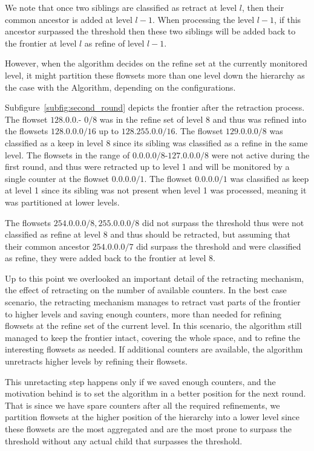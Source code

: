 We note that once two siblings are classified as retract at level $l$, then their common ancestor is added at level $l-1$. When processing the level $l-1$, if this ancestor surpassed the threshold then these two siblings will be added back to the frontier at level $l$ as refine of level $l-1$.

However, when the algorithm decides on the refine set at the currently monitored level, it might partition these flowsets more than one level down the hierarchy as the case with the \multipleAlgo Algorithm, depending on the configurations.

Subfigure~\ref{subfig:second_round} depicts the frontier after the retraction process. The flowset $128.0.0.$- $0/8$ was in the refine set of level 8 and thus was refined into the flowsets $128.0.0.0/16$ up to $128.255.0.0/16$. The flowset $129.0.0.0/8$ was classified as a keep in level 8 since its sibling was classified as a refine in the same level. The flowsets in the range of $0.0.0.0/8$-$127.0.0.0/8$ were not active during the first round, and thus were retracted up to level 1 and will be monitored by a single counter at the flowset $0.0.0.0/1$. The flowset $0.0.0.0/1$ was classified as keep at level 1 since its sibling was not present when level 1 was processed, meaning it was partitioned at lower levels.

The flowsets $254.0.0.0/8, 255.0.0.0/8$ did not surpass the threshold thus were not classified as refine at level 8 and thus should be retracted, but assuming that their common ancestor $254.0.0.0/7$ did surpass the threshold and were classified as refine, they were added back to the frontier at level 8.

Up to this point we overlooked an important detail of the retracting mechanism, the effect of retracting on the number of available counters. In the best case scenario, the retracting mechanism manages to retract vast parts of the frontier to higher levels and saving enough counters, more than needed for refining flowsets at the refine set of the current level. In this scenario, the algorithm still managed to keep the frontier intact, covering the whole space, and to refine the interesting flowsets as needed.
If additional counters are available, the algorithm unretracts higher levels by refining their flowsets.

This unretacting step happens only if we saved enough counters, and the motivation behind is to set the algorithm in a better position for the next round. That is since we have spare counters after all the required refinements, we partition flowsets at the higher position of the hierarchy into a lower level since these flowsets are the most aggregated and are the most prone to surpass the threshold without any actual child that surpasses the threshold.

